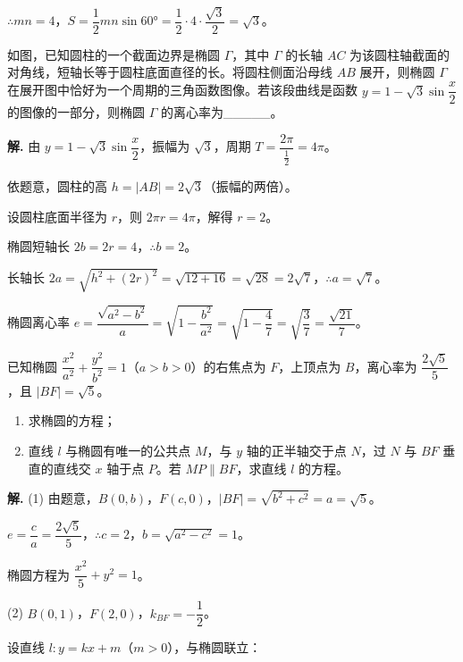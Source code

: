 \documentclass[11pt]{ctexrep}
\begin{document}
$\therefore mn = 4$，$S = \dfrac{1}{2}mn\sin 60° = \dfrac{1}{2} \cdot 4 \cdot \dfrac{\sqrt{3}}{2} = \boxed{\sqrt{3}}$。

\begin{realexam}[2026 崇明二模]
    如图，已知圆柱的一个截面边界是椭圆 $\Gamma$，其中 $\Gamma$ 的长轴 $AC$ 为该圆柱轴截面的对角线，短轴长等于圆柱底面直径的长。将圆柱侧面沿母线 $AB$ 展开，则椭圆 $\Gamma$ 在展开图中恰好为一个周期的三角函数图像。若该段曲线是函数 $y = 1 - \sqrt{3}\sin\dfrac{x}{2}$ 的图像的一部分，则椭圆 $\Gamma$ 的离心率为\_\_\_\_\_。
\end{realexam}

\textbf{解.} 由 $y = 1 - \sqrt{3}\sin\dfrac{x}{2}$，振幅为 $\sqrt{3}$，周期 $T = \dfrac{2\pi}{\frac{1}{2}} = 4\pi$。

依题意，圆柱的高 $h = |AB| = 2\sqrt{3}$（振幅的两倍）。

设圆柱底面半径为 $r$，则 $2\pi r = 4\pi$，解得 $r = 2$。

椭圆短轴长 $2b = 2r = 4$，$\therefore b = 2$。

长轴长 $2a = \sqrt{h^2 + (2r)^2} = \sqrt{12 + 16} = \sqrt{28} = 2\sqrt{7}$，$\therefore a = \sqrt{7}$。

椭圆离心率 $e = \dfrac{\sqrt{a^2 - b^2}}{a} = \sqrt{1 - \dfrac{b^2}{a^2}} = \sqrt{1 - \dfrac{4}{7}} = \sqrt{\dfrac{3}{7}} = \boxed{\dfrac{\sqrt{21}}{7}}$。

\begin{realexam}[练习]
    已知椭圆 $\dfrac{x^2}{a^2} + \dfrac{y^2}{b^2} = 1$（$a > b > 0$）的右焦点为 $F$，上顶点为 $B$，离心率为 $\dfrac{2\sqrt{5}}{5}$，且 $|BF| = \sqrt{5}$。
    \begin{enumerate}
        \item 求椭圆的方程；
        \item 直线 $l$ 与椭圆有唯一的公共点 $M$，与 $y$ 轴的正半轴交于点 $N$，过 $N$ 与 $BF$ 垂直的直线交 $x$ 轴于点 $P$。若 $MP \parallel BF$，求直线 $l$ 的方程。
    \end{enumerate}
\end{realexam}

\textbf{解.} (1) 由题意，$B(0, b)$，$F(c, 0)$，$|BF| = \sqrt{b^2 + c^2} = a = \sqrt{5}$。

$e = \dfrac{c}{a} = \dfrac{2\sqrt{5}}{5}$，$\therefore c = 2$，$b = \sqrt{a^2 - c^2} = 1$。

椭圆方程为 $\boxed{\dfrac{x^2}{5} + y^2 = 1}$。

(2) $B(0, 1)$，$F(2, 0)$，$k_{BF} = -\dfrac{1}{2}$。

设直线 $l: y = kx + m$（$m > 0$），与椭圆联立：
\end{document}
